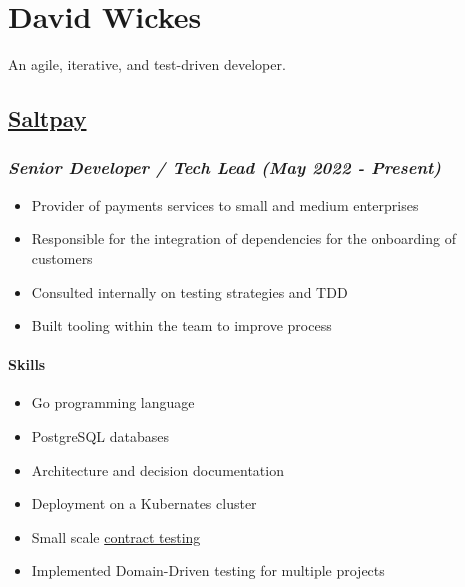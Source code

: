 \hypertarget{david-wickes}{%
\section{David Wickes}\label{david-wickes}}

An agile, iterative, and test-driven developer.

\hypertarget{saltpay}{%
\subsection{\texorpdfstring{\href{https://www.saltpay.co/}{Saltpay}}{Saltpay}}\label{saltpay}}

\hypertarget{saltpay-role}{%
\subsubsection{\texorpdfstring{\emph{Senior Developer / Tech Lead (May
2022 -
Present)}}{Senior Developer / Tech Lead (May 2022 - Present)}}\label{saltpay-role}}

\begin{itemize}
\tightlist
\item
  Provider of payments services to small and medium enterprises
\item
  Responsible for the integration of dependencies for the onboarding of
  customers
\item
  Consulted internally on testing strategies and TDD
\item
  Built tooling within the team to improve process
\end{itemize}

\hypertarget{skills-saltpay}{%
\paragraph{Skills}\label{skills-saltpay}}

\begin{itemize}
\tightlist
\item
  Go programming language
\item
  PostgreSQL databases
\item
  Architecture and decision documentation
\item
  Deployment on a Kubernates cluster
\item
  Small scale
  \href{https://martinfowler.com/bliki/ContractTest.html}{contract
  testing}
\item
  Implemented Domain-Driven testing for multiple projects
\end{itemize}

